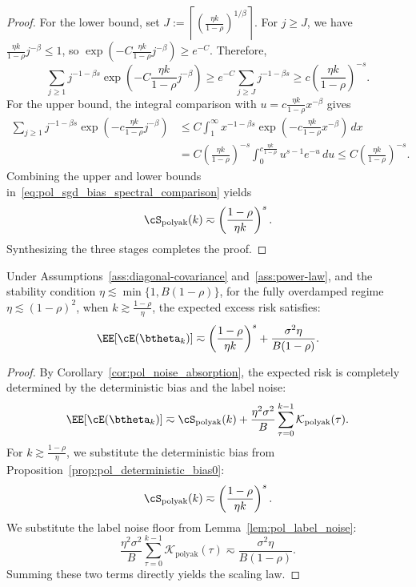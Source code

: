 \documentclass[11pt]{article}
\newcommand{\polyak}{\mathrm{polyak}}
\begin{document}
\begin{proof}
For the lower bound, set $J:=\left\lceil \left(\frac{\eta k}{1-\rho}\right)^{1/\beta}\right\rceil$. For $j\ge J$, we have $\frac{\eta k}{1-\rho}j^{-\beta}\le1$, so $\exp(-C\frac{\eta k}{1-\rho}j^{-\beta})\ge e^{-C}$. Therefore,
\[
    \sum_{j\ge1}j^{-1-\beta s}\exp\left(-C\frac{\eta k}{1-\rho}j^{-\beta}\right)
    \ge
    e^{-C}\sum_{j\ge J}j^{-1-\beta s}
    \ge
    c\left(\frac{\eta k}{1-\rho}\right)^{-s}.
\]
For the upper bound, the integral comparison with $u=c\frac{\eta k}{1-\rho}x^{-\beta}$ gives
\begin{align*}
    \sum_{j\ge1}j^{-1-\beta s}\exp\left(-c\frac{\eta k}{1-\rho}j^{-\beta}\right)
    &\le
    C\int_1^\infty x^{-1-\beta s}\exp\left(-c\frac{\eta k}{1-\rho}x^{-\beta}\right)\,dx \\
    &=
    C \left(\frac{\eta k}{1-\rho}\right)^{-s}\int_0^{c\frac{\eta k}{1-\rho}}u^{s-1}e^{-u}\,du
    \le
    C \left(\frac{\eta k}{1-\rho}\right)^{-s}.
\end{align*}
Combining the upper and lower bounds in~\eqref{eq:pol_sgd_bias_spectral_comparison} yields
\[
    \cS_{\polyak}(k)
    \eqsim
    \left(\frac{1-\rho}{\eta k}\right)^s.
\]
Synthesizing the three stages completes the proof.
\end{proof}

\begin{theorem}
\label{thm:pol_scaling_sgd}
Under Assumptions~\ref{ass:diagonal-covariance} and~\ref{ass:power-law}, and the stability condition $\eta \lesssim \min\{1,B(1-\rho)\}$, for the fully overdamped regime $\eta\lesssim(1-\rho)^2$, when $k\gtrsim \frac{1-\rho}{\eta}$, the expected excess risk satisfies:
\[
    \EE[\cE(\btheta_k)]
    \eqsim
    \left(\frac{1-\rho}{\eta k}\right)^s
    +
    \frac{\sigma^2\eta}{B(1-\rho)}.
\]
\end{theorem}
\begin{proof}
By Corollary~\ref{cor:pol_noise_absorption}, the expected risk is completely determined by the deterministic bias and the label noise:
\[
    \EE[\cE(\btheta_k)] \eqsim \cS_{\polyak}(k) + \frac{\eta^2\sigma^2}{B}\sum_{\tau=0}^{k-1}\mathcal{K}_{\polyak}(\tau).
\]
For $k \gtrsim \frac{1-\rho}{\eta}$, we substitute the deterministic bias from Proposition~\ref{prop:pol_deterministic_bias0}:
\[
    \cS_{\polyak}(k) \eqsim \left(\frac{1-\rho}{\eta k}\right)^s.
\]
We substitute the label noise floor from Lemma~\ref{lem:pol_label_noise}:
\[
    \frac{\eta^2\sigma^2}{B}\sum_{\tau=0}^{k-1}\mathcal{K}_{\polyak}(\tau) \eqsim \frac{\sigma^2\eta}{B(1-\rho)}.
\]
Summing these two terms directly yields the scaling law.
\end{proof}
\end{document}
